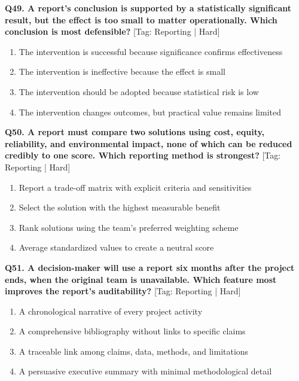 \noindent\textbf{Q49. A report's conclusion is supported by a statistically significant result, but the effect is too small to matter operationally. Which conclusion is most defensible?} \hfill [Tag: Reporting | Hard]
\begin{enumerate}[label=(\alph*),topsep=2pt,itemsep=1pt,partopsep=0pt,parsep=0pt]
    \item {The intervention is successful because significance confirms effectiveness}
    \item {The intervention is ineffective because the effect is small}
    \item {The intervention should be adopted because statistical risk is low}
    \item {The intervention changes outcomes, but practical value remains limited}
\end{enumerate}
\vspace{2mm}

\noindent\textbf{Q50. A report must compare two solutions using cost, equity, reliability, and environmental impact, none of which can be reduced credibly to one score. Which reporting method is strongest?} \hfill [Tag: Reporting | Hard]
\begin{enumerate}[label=(\alph*),topsep=2pt,itemsep=1pt,partopsep=0pt,parsep=0pt]
    \item {Report a trade-off matrix with explicit criteria and sensitivities}
    \item {Select the solution with the highest measurable benefit}
    \item {Rank solutions using the team's preferred weighting scheme}
    \item {Average standardized values to create a neutral score}
\end{enumerate}
\vspace{2mm}

\noindent\textbf{Q51. A decision-maker will use a report six months after the project ends, when the original team is unavailable. Which feature most improves the report's auditability?} \hfill [Tag: Reporting | Hard]
\begin{enumerate}[label=(\alph*),topsep=2pt,itemsep=1pt,partopsep=0pt,parsep=0pt]
    \item {A chronological narrative of every project activity}
    \item {A comprehensive bibliography without links to specific claims}
    \item {A traceable link among claims, data, methods, and limitations}
    \item {A persuasive executive summary with minimal methodological detail}
\end{enumerate}
\vspace{2mm}


